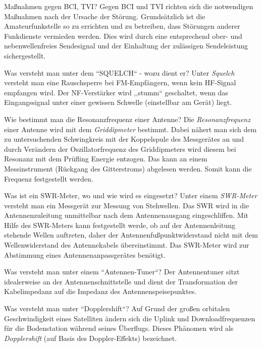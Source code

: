 \documentclass[avery5371,grid,frame,a4paper]{flashcards}
\newcommand{\card}[3]{
  \begin{flashcard}[{\chap} -- #1]{#2}#3\end{flashcard}
}
\begin{document}
\card{43}{Maßnahmen gegen BCI, TVI?}{
  Gegen BCI und TVI richten sich die notwendigen Maßnahmen nach der Ursache der Störung.
  Grundsätzlich ist die Amateurfunkstelle so zu errichten und zu betreiben, dass Störungen anderer Funkdienste vermieden werden.
  Dies wird durch eine entsprechend ober- und nebenwellenfreies Sendesignal und der Einhaltung der zulässigen Sendeleistung sichergestellt.
}
\card{44}{Was versteht man unter dem ``SQUELCH`` - wozu dient er?}{
  Unter \emph{Squelch} versteht man eine Rauschsperre bei FM-Empfängern, wenn kein HF-Signal empfangen wird. Der NF-Verstärker wird ,,stumm`` geschaltet, wenn das Eingangssignal unter einer gewissen Schwelle (einstellbar am Gerät) liegt.
}
\card{45}{Wie bestimmt man die Resonanzfrequenz einer Antenne?}{
  Die \emph{Resonanzfrequenz} einer Antenne wird mit dem \emph{Griddipmeter} bestimmt.
  Dabei nähert man sich dem zu untersuchenden Schwingkreis mit der Koppelspule des Messgerätes an und durch Verändern der Oszillatorfrequenz des Griddipmeters wird diesem bei Resonanz mit dem Prüfling Energie entzogen. Das kann an einem Messinstrument (Rückgang des Gitterstroms) abgelesen werden. Somit kann die Frequenz festgestellt werden.
}
\card{46}{Was ist ein SWR-Meter, wo und wie wird es eingesetzt?}{
  Unter einem \emph{SWR-Meter} versteht man ein Messgerät zur Messung von Stehwellen. Das SWR wird in die Antennenzuleitung unmittelbar nach dem Antennenausgang eingeschliffen. Mit Hilfe des SWR-Meters kann festgestellt werde, ob auf der Antennenleitung stehende Wellen auftreten, daher der Antennenfußpunktwiderstand nicht mit dem Wellenwiderstand des Antennekabels übereinstimmt.
  Das SWR-Meter wird zur Abstimmung eines Antennenanpassgerätes benötigt.
}
\card{47}{Was versteht man unter einem ``Antennen-Tuner``?}{
  Der Antennentuner sitzt idealerweise an der Antennenschnittstelle und dient der Transformation der Kabelimpedanz auf die Impedanz des Antennenspeisepunktes.
}
\card{48}{Was versteht man unter ``Dopplershift``?}{
  Auf Grund der großen orbitalen Geschwindigkeit eines Satelliten ändern sich die Uplink und Downloadfrequenzen für die Bodenstation während seines Überflugs. Dieses Phänomen wird als \emph{Dopplershift} (auf Basis des Doppler-Effekts) bezeichnet.}
\end{document}
